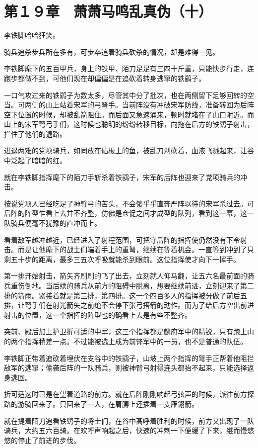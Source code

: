 \section{第１９章　萧萧马鸣乱真伪（十）}

李铁脚哈哈狂笑。

骑兵追杀步兵所在多有，可步卒追着骑兵砍杀的情况，却是难得一见。

李铁脚麾下的五百甲兵，身上的铁甲、陌刀足足有三四十斤重，只能快步行走，连跑步都做不到，可他们现在却偏偏是在追砍着转身逃窜的铁鹞子。

一口气攻过来的铁鹞子为数太多，尽管其中分了批次，也在两侧留下足够回转的空当。可两侧的山上站着宋军的弓弩手。当前阵没有冲破宋军防线，准备转回为后阵空下位置的时候，却被乱箭阻住。而后面又急速涌来，顿时就堵在了山口附近。而山上的宋军弩弓手们，这时候也聪明的纷纷转移目标，向拖在后方的铁鹞子射击，拦住了他们的退路。

进退两难的党项骑兵，如同放在砧板上的鱼，被乱刀剁砍着，血液飞溅起来，让谷中泛起了暗暗的红。

就在李铁脚指挥麾下的陌刀手斩杀着铁鹞子，宋军的后阵也迎来了党项骑兵的冲击。

按说党项人已经吃足了神臂弓的苦头，不会傻乎乎直奔严阵以待的宋军杀过去。可后阵的阵型乍看上去并不齐整，仿佛是仓促之间才成型的队列，看到这一幕，这一队骑兵便毫不犹豫的直冲而上。

看着敌军越冲越近，已经进入了射程范围，可把守后阵的指挥使仍然没有下令射击。而是让他麾下的战士们端着手上的重弩，继续在等着机会。一直等到冲到了只剩五十步的距离，最多三五次呼吸就能杀到眼前。这位指挥使才向下一挥手。

第一排开始射击，箭矢齐刷刷的飞了出去，立刻就人仰马翻，让五六名最前面的骑兵重伤倒地。当后续的骑兵从前方的阻碍中脱离，想要继续前进，立刻迎来了第二排的箭雨。紧接着就是第三排，第四排。这一个四百多人的指挥被分做了前后五排，让弩手们在射光箭矢之前绝不会停下张弓搭箭的动作。而为了给后方空出前进射击的位置，这一个指挥的阵型也的确看上去是有些不整齐。

突前、殿后加上护卫折可适的中军，这三个指挥都是麟府军中的精锐，只有跑上山的两个指挥稍差一点。不过能被选上成为前锋军中的一员，也不是普通的队伍。

李铁脚正带着追砍着埋伏在支谷中的铁鹞子，山坡上两个指挥的弩手正帮着他阻拦敌军的逃窜；偷袭后阵的一队骑兵，则被神臂弓射得连头都抬不起来，只能选择返身逃回。

折可适这时已是在望着道路的前方。就在后阵刚刚响起弓弦声的时候，派往前方探路的游骑回来了。只回来了一人，在肩膊上还插着一支雁翎箭。

就在提着陌刀追看铁鹞子的将士们，在谷中髙呼着胜利的时候，前方又出现了一队骑兵，大约五六百骑。在欢呼声响起之后，快速的冲刺一下便缓了下来，继而慢悠悠的停止了前进的步伐。


